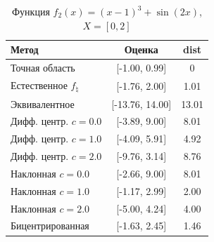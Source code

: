 \begin{table}[H]
\centering
\begin{tabular}{|l|c|c|}
\hline
Метод & Оценка & dist \\
\hline
Точная область & [-1.00, 0.99] & 0 \\
Естественное $f_{\natural}$ & [-1.76, 2.00] & 1.01 \\
Эквивалентное & [-13.76, 14.00] & 13.01 \\
Дифф. центр. $c=0.0$ & [-3.89, 9.00] & 8.01 \\
Дифф. центр. $c=1.0$ & [-4.09, 5.91] & 4.92 \\
Дифф. центр. $c=2.0$ & [-9.76, 3.14] & 8.76 \\
Наклонная $c=0.0$ & [-2.66, 9.00] & 8.01 \\
Наклонная $c=1.0$ & [-1.17, 2.99] & 2.00 \\
Наклонная $c=2.0$ & [-5.00, 4.24] & 4.00 \\
Бицентрированная & [-1.63, 2.45] & 1.46 \\
\hline
\end{tabular}
\caption{Функция $f_2(x)=(x-1)^3+\sin(2x)$, $X=[0,2]$}
\end{table}
